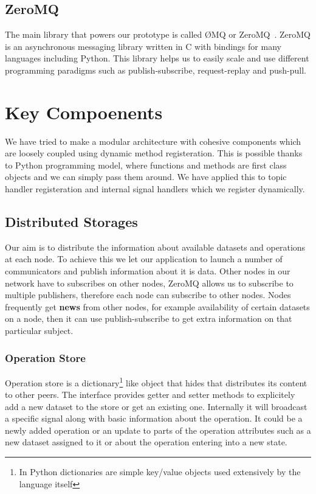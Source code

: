 \subsection{ZeroMQ}
The main library that powers our prototype is called ØMQ or ZeroMQ~\cite{ZeroMQ}.
ZeroMQ is an asynchronous messaging library written in C with 
bindings for many languages including Python. This library helps us to easily scale and use 
different programming paradigms such as publish-subscribe, request-replay and push-pull.

\section{Key Compoenents}
We have tried to make a modular architecture with cohesive components which are loosely coupled using dynamic
method registeration. This is possible thanks to Python programming model, where functions and methods are first
class objects and we can simply pass them around. We have applied this to topic handler registeration and
internal signal handlers which we register dynamically.

\subsection{Distributed Storages}
Our aim is to distribute the information about available datasets and operations at each node. To achieve this
we let our application to launch a number of communicators and publish information about it is data.
Other nodes in our network have to subscribes on other nodes, ZeroMQ allows us to subscribe
to multiple publishers, therefore each node can subscribe to other nodes. Nodes frequently get
\textbf{news} from other nodes, for example availability of certain datasets on a node, then it
can use publish-subscribe to get extra information on that particular subject.

\subsubsection{Operation Store}
Operation store is a dictionary\footnote{In Python dictionaries 
are simple key/value objects used extensively by the language itself} 
like object that hides that distributes its content to other peers.
The interface provides getter and setter methods to explicitely add a new dataset to the store or
get an existing one.
Internally it will broadcast a specific signal along with basic information about the operation. 
It could be a newly added operation or an update to parts of the operation attributes such as a new dataset assigned
to it or about the operation entering into a new state.

